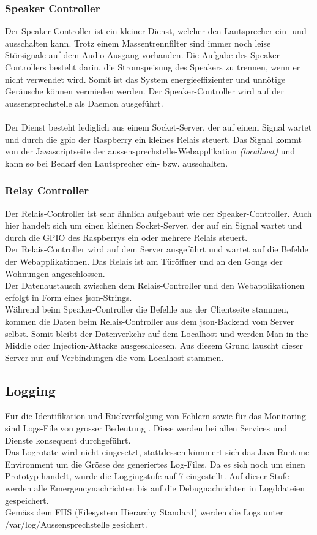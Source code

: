\subsubsection{Speaker Controller}
Der Speaker-Controller ist ein kleiner Dienst, welcher den Lautsprecher ein- und ausschalten kann. Trotz einem Massentrennfilter sind immer noch leise Störsignale auf dem Audio-Ausgang vorhanden. Die Aufgabe des Speaker-Controllers besteht darin, die Stromspeisung des Speakers zu trennen, wenn er nicht verwendet wird. Somit ist das System energieeffizienter und unnötige Geräusche können vermieden werden. Der Speaker-Controller wird auf der \gls{aussensprechstelle} als Daemon ausgeführt.
\\
\\
Der Dienst besteht lediglich aus einem Socket-Server, der auf einem Signal wartet und durch die \gls{gpio} der Raspberry ein kleines Relais steuert. Das Signal kommt von der Javascriptseite der \gls{aussensprechstelle}-Webapplikation \textit{(localhost)} und kann so bei Bedarf den Lautsprecher ein- bzw. ausschalten.
\\

\subsubsection{Relay Controller}
Der Relais-Controller ist sehr ähnlich aufgebaut wie der Speaker-Controller. Auch hier handelt sich um einen kleinen Socket-Server, der auf ein Signal wartet und durch die GPIO des Raspberrys ein oder mehrere Relais steuert.
\\
Der Relais-Controller wird auf dem Server ausgeführt und wartet auf die Befehle der Webapplikationen. Das Relais ist am Türöffner und an den Gongs der Wohnungen angeschlossen.
\\
Der Datenaustausch zwischen dem Relais-Controller und den Webapplikationen erfolgt in Form eines \gls{json}-Strings.
\\
Während beim Speaker-Controller die Befehle aus der Clientseite stammen, kommen die Daten beim Relais-Controller aus dem \gls{json}-Backend vom Server selbst. Somit bleibt der Datenverkehr auf dem Localhost und werden Man-in-the-Middle oder Injection-Attacke ausgeschlossen. Aus diesem Grund lauscht dieser Server nur auf Verbindungen die vom Localhost stammen.

\subsection{Logging}
\label{kap:logs}
Für die Identifikation und Rückverfolgung von Fehlern sowie für das Monitoring sind Logs-File von grosser Bedeutung \cite{logging}. Diese werden bei allen Services und Dienste konsequent durchgeführt. 
\\
Das Logrotate wird nicht eingesetzt, stattdessen kümmert sich das Java-Runtime-Environment um die Grösse des generiertes Log-Files.  Da es sich noch um einen Prototyp handelt, wurde die Loggingstufe auf 7 eingestellt. Auf dieser Stufe werden alle Emergencynachrichten bis auf die Debugnachrichten in Logddateien gespeichert. 
\\
Gemäss dem FHS (Filesystem Hierarchy Standard) werden die Logs unter /var/log/Aussensprechstelle gesichert.

